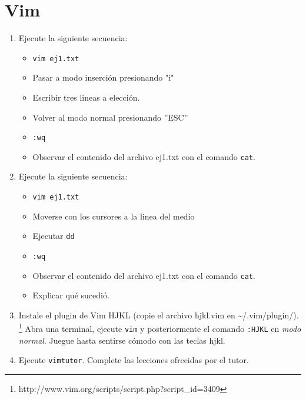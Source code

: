 \documentclass[12pt]{article}
\begin{document}
\section*{Vim}
\begin{enumerate}
\item Ejecute la siguiente secuencia:
	\begin{itemize}
	\item \texttt{vim ej1.txt}
        \item Pasar a modo inserción presionando "i"
        \item Escribir tres lineas a elección. 
        \item Volver al modo normal presionando ''ESC''
        \item \texttt{:wq}
	\item Observar el contenido del archivo ej1.txt con el comando \texttt{cat}. 
	\end{itemize}
\item Ejecute la siguiente secuencia:
	\begin{itemize}
        \item \texttt{vim ej1.txt}
        \item Moverse con los cursores a la linea del medio
        \item Ejecutar \texttt{dd}
        \item \texttt{:wq}
	\item Observar el contenido del archivo ej1.txt con el comando \texttt{cat}. 
        \item Explicar qué sucedió. 
	\end{itemize}
\item Instale el plugin de Vim HJKL (copie el archivo hjkl.vim en \textasciitilde/.vim/plugin/). 
 \footnote{http://www.vim.org/scripts/script.php?script\_id=3409}
Abra una terminal, ejecute \texttt{vim} y posteriormente el comando \texttt{:HJKL} en \textit{modo normal}. 
Juegue hasta sentirse cómodo con las teclas hjkl. 
\item Ejecute \texttt{vimtutor}. Complete las lecciones ofrecidas por el tutor. 
\end{enumerate}
\end{document}
